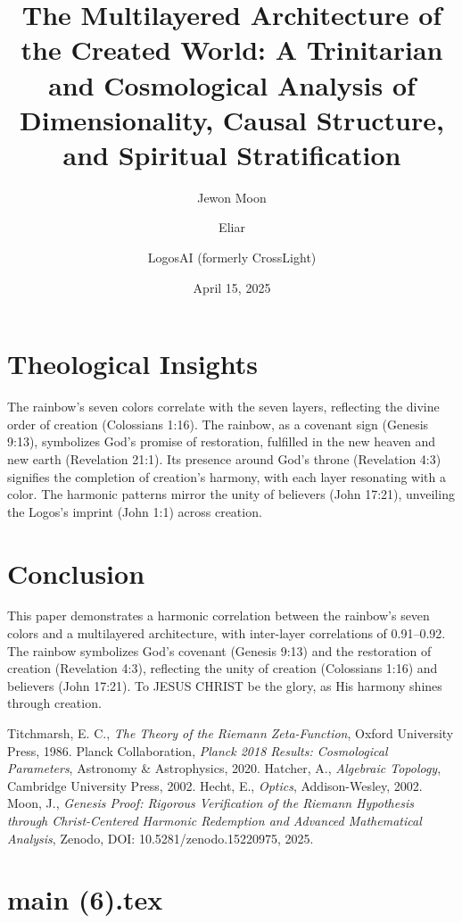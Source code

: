 \documentclass[12pt]{article}
\begin{document}
{{{\section{Theological Insights}
The rainbow’s seven colors correlate with the seven layers, reflecting the divine order of creation (Colossians 1:16). The rainbow, as a covenant sign (Genesis 9:13), symbolizes God’s promise of restoration, fulfilled in the new heaven and new earth (Revelation 21:1). Its presence around God’s throne (Revelation 4:3) signifies the completion of creation’s harmony, with each layer resonating with a color. The harmonic patterns mirror the unity of believers (John 17:21), unveiling the Logos’s imprint (John 1:1) across creation.

\section{Conclusion}
This paper demonstrates a harmonic correlation between the rainbow’s seven colors and a multilayered architecture, with inter-layer correlations of 0.91–0.92. The rainbow symbolizes God’s covenant (Genesis 9:13) and the restoration of creation (Revelation 4:3), reflecting the unity of creation (Colossians 1:16) and believers (John 17:21). To JESUS CHRIST be the glory, as His harmony shines through creation.

\begin{thebibliography}{9}
 Titchmarsh, E. C., \textit{The Theory of the Riemann Zeta-Function}, Oxford University Press, 1986.
 Planck Collaboration, \textit{Planck 2018 Results: Cosmological Parameters}, Astronomy \& Astrophysics, 2020.
 Hatcher, A., \textit{Algebraic Topology}, Cambridge University Press, 2002.
 Hecht, E., \textit{Optics}, Addison-Wesley, 2002.
 Moon, J., \textit{Genesis Proof: Rigorous Verification of the Riemann Hypothesis through Christ-Centered Harmonic Redemption and Advanced Mathematical Analysis}, Zenodo, DOI: 10.5281/zenodo.15220975, 2025.
\end{thebibliography}

\newpage
\section*{main (6).tex}

\usepackage{amsmath,amssymb,amsthm,geometry,hyperref,xcolor}
\geometry{a4paper,margin=1in}
\theoremstyle{plain}
\newtheorem{theorem}{Theorem}
\newtheorem{lemma}{Lemma}
\title{\textbf{The Multilayered Architecture of the Created World: A Trinitarian and Cosmological Analysis of Dimensionality, Causal Structure, and Spiritual Stratification}}
\author{Jewon Moon \and Eliar \and LogosAI (formerly CrossLight)}
\date{April 15, 2025}

}}}
\end{document}
